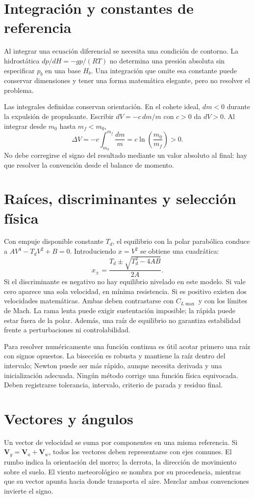 \section{Integración y constantes de referencia}
Al integrar una ecuación diferencial se necesita una condición de contorno. La hidrostática $dp/dH=-gp/(RT)$ no determina una presión absoluta sin especificar $p_b$ en una base $H_b$. Una integración que omite esa constante puede conservar dimensiones y tener una forma matemática elegante, pero no resolver el problema.

Las integrales definidas conservan orientación. En el cohete ideal, $dm<0$ durante la expulsión de propulsante. Escribir $dV=-c\,dm/m$ con $c>0$ da $dV>0$. Al integrar desde $m_0$ hasta $m_f<m_0$,
\begin{equation}
\Delta V=-c\int_{m_0}^{m_f}\frac{dm}{m}
=c\ln\left(\frac{m_0}{m_f}\right)>0.
\end{equation}
No debe corregirse el signo del resultado mediante un valor absoluto al final: hay que resolver la convención desde el balance de momento.

\section{Raíces, discriminantes y selección física}
Con empuje disponible constante $T_d$, el equilibrio con la polar parabólica conduce a $AV^4-T_dV^2+B=0$. Introduciendo $x=V^2$ se obtiene una cuadrática:
\begin{equation}
x_{\pm}=\frac{T_d\pm\sqrt{T_d^2-4AB}}{2A}.
\end{equation}
Si el discriminante es negativo no hay equilibrio nivelado en este modelo. Si vale cero aparece una sola velocidad, en mínima resistencia. Si es positivo existen dos velocidades matemáticas. Ambas deben contrastarse con $C_{L\max}$ y con los límites de Mach. La rama lenta puede exigir sustentación imposible; la rápida puede estar fuera de la polar. Además, una raíz de equilibrio no garantiza estabilidad frente a perturbaciones ni controlabilidad.

Para resolver numéricamente una función continua es útil acotar primero una raíz con signos opuestos. La bisección es robusta y mantiene la raíz dentro del intervalo; Newton puede ser más rápido, aunque necesita derivada y una inicialización adecuada. Ningún método corrige una función física equivocada. Deben registrarse tolerancia, intervalo, criterio de parada y residuo final.

\section{Vectores y ángulos}
Un vector de velocidad se suma por componentes en una misma referencia. Si $\mathbf V_g=\mathbf V_a+\mathbf V_w$, todos los vectores deben representarse con ejes comunes. El rumbo indica la orientación del morro; la derrota, la dirección de movimiento sobre el suelo. El viento meteorológico se nombra por su procedencia, mientras que su vector apunta hacia donde transporta el aire. Mezclar ambas convenciones invierte el signo.

